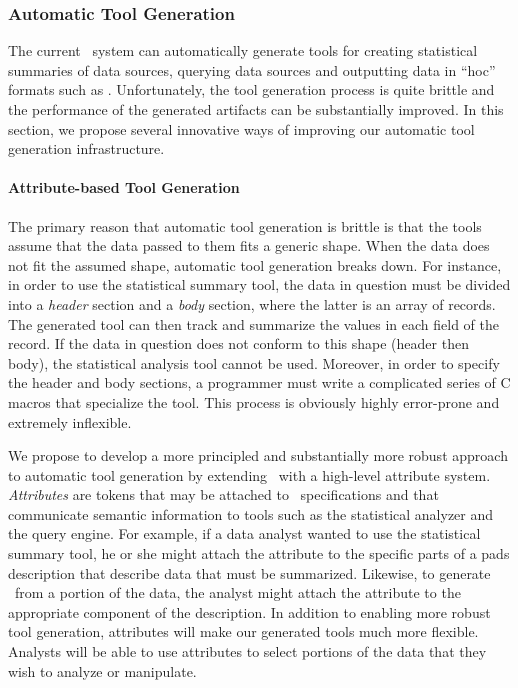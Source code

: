 \documentclass[11pt]{article}
\begin{document}

\subsubsection{Automatic Tool Generation}

The current \pads{}\ system can automatically generate tools for
creating statistical summaries of data sources, querying
data sources and outputting data in ``hoc'' formats such as
\xml.  Unfortunately, the tool generation process is quite brittle and the
performance of the generated artifacts can be substantially improved.  
In this section, we propose several innovative ways of improving our
automatic tool generation infrastructure.

\paragraph*{Attribute-based Tool Generation}
The primary reason that automatic tool generation is brittle
is that the tools assume that the data passed to them fits a generic
shape.  When the data does not fit the assumed shape, automatic
tool generation breaks down.  For instance, in order to use the
statistical summary tool, the data in question must be divided
into a {\em header} section and a {\em body} section, where the latter
is an array of records.  The generated tool can then track and summarize
the values in each field of the record.  If the data in question
does not conform to this shape (header then body), the statistical
analysis tool cannot be used.  Moreover, in order to specify 
the header and body sections, a programmer must write a complicated series of
C macros that specialize the tool.  This process is obviously highly error-prone 
and extremely inflexible.

We propose to develop a more principled and substantially more robust
approach to automatic tool generation by extending \pads{}\ with a
high-level attribute system.  {\em Attributes} are tokens that may be
attached to \pads{}\ specifications and that communicate semantic
information to tools such as the statistical analyzer and the query
engine.  For example, if a data analyst wanted to use the statistical
summary tool, he or she might attach the {} attribute to
the specific parts of a pads description that describe data that must
be summarized.  Likewise, to generate \xml{}\ from a portion of the
data, the analyst might attach the {} attribute to the
appropriate component of the \pads{} description.  In addition to
enabling more robust tool generation, attributes will make our
generated tools much more flexible.  Analysts will be able to use
attributes to select portions of the data that they wish to analyze or
manipulate.
\end{document}

